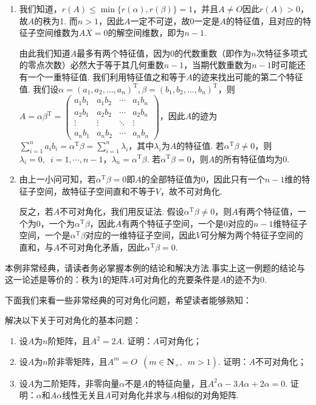 \begin{solution}
    \begin{enumerate}
        \item 我们知道，$r(A)\leqslant\min{\{r(\alpha),r(\beta)\}}=1$，并且$A\neq O$因此$r(A)>0$，故$A$的秩为1. 而$n>1$，因此$A$一定不可逆，故0一定是$A$的特征值，且对应的特征子空间维数为$AX=0$的解空间维数，即为$n-1$.

        由此我们知道$A$最多有两个特征值，因为0的代数重数（即作为$n$次特征多项式的零点次数）必然大于等于其几何重数$n-1$，当期代数重数为$n-1$时可能还有一个一重特征值. 我们利用特征值之和等于$A$的迹来找出可能的第二个特征值. 我们设$\alpha=(a_1,a_2,\ldots,a_n)^\mathrm{T},\beta=(b_1,b_2,\ldots,b_n)^\mathrm{T}$，则$A=\alpha\beta^\mathrm{T}=\begin{pmatrix}
                a_1b_1 & a_1b_2 & \cdots & a_1b_n \\
                a_2b_1 & a_2b_2 & \cdots & a_2b_n \\
                \vdots & \vdots & \ddots & \vdots \\
                a_nb_1 & a_nb_2 & \cdots & a_nb_n
            \end{pmatrix}$，因此$A$的迹为$\sum\limits_{i=1}^na_ib_i=\alpha^\mathrm{T}\beta=\sum\limits_{i=1}^n\lambda_i$，其中$\lambda_i$为$A$的特征值. 若$\alpha^\mathrm{T}\beta\neq 0$，则$\lambda_i=0,\enspace i=1,\cdots,n-1$，$\lambda_n=\alpha^\mathrm{T}\beta$. 若$\alpha^\mathrm{T}\beta=0$，则$A$的所有特征值均为0.

        \item 由上一小问可知，若$\alpha^\mathrm{T}\beta=0$即$A$的全部特征值为0，因此只有一个$n-1$维的特征子空间，故特征子空间直和不等于$V$，故不可对角化.

        反之，若$A$不可对角化，我们用反证法. 假设$\alpha^\mathrm{T}\beta\neq 0$，则$A$有两个特征值，一个为0，一个为$\alpha^\mathrm{T}\beta$，因此$A$有两个特征子空间，一个是0对应的$n-1$维特征子空间，一个是$\alpha^\mathrm{T}\beta$对应的一维特征子空间，因此$V$可分解为两个特征子空间的直和，与$A$不可对角化矛盾，因此$\alpha^\mathrm{T}\beta=0$.
    \end{enumerate}
\end{solution}

本例非常经典，请读者务必掌握本例的结论和解决方法.事实上这一例题的结论与这一论述是等价的：秩为1的矩阵$A$可对角化的充要条件是$A$的迹不为0.

下面我们来看一些非常经典的可对角化问题，希望读者能够熟知：
\begin{example}\label{ex:19:可对角化经典例题}
    解决以下关于可对角化的基本问题：
    \begin{enumerate}
        \item 设$A$为$n$阶矩阵，且$A^2=2A$. 证明：$A$可对角化；

        \item 设$A$为$n$阶非零矩阵，且$A^m=O\enspace(m\in\mathbf{N}_+,\enspace m>1)$. 证明：$A$不可对角化；

        \item 设$A$为二阶矩阵，非零向量$\alpha$不是$A$的特征向量，且$A^2\alpha-3A\alpha+2\alpha=0$. 证明：$\alpha$和$A\alpha$线性无关且$A$可对角化并求与$A$相似的对角矩阵.
    \end{enumerate}
\end{example}

